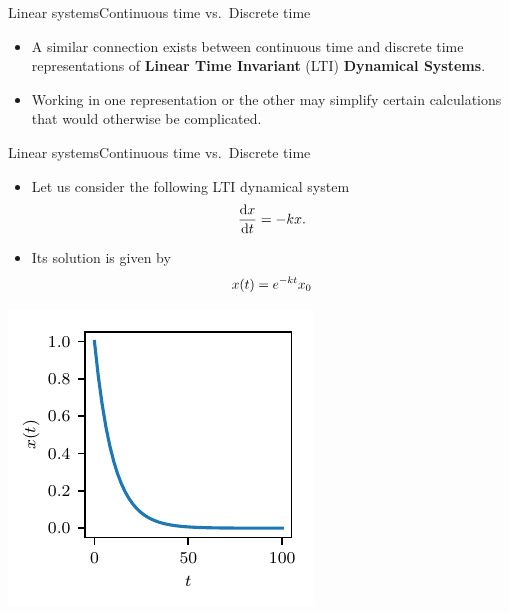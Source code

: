 \documentclass[usenames,dvipsnames,svgnames,10pt,aspectratio=169]{beamer}
\begin{document}
\begin{frame}[t, c]{Linear systems}{Continuous time vs.\ Discrete time}
	\begin{itemize}
		\item A similar connection exists between continuous time and discrete time representations of \alert{\textbf{Linear Time Invariant}} (LTI) \alert{\textbf{Dynamical Systems}}.

		\bigskip

		\item Working in one representation or the other may simplify certain calculations that would otherwise be complicated.
	\end{itemize}
	\vspace{1cm}
\end{frame}

\begin{frame}[t, c]{Linear systems}{Continuous time vs.\ Discrete time}
	\begin{minipage}{.48\textwidth}
		\begin{itemize}
			\item Let us consider the following LTI dynamical system
			\begin{equation}
				\displaystyle \frac{\mathrm{d}x}{\mathrm{d}t} = -k x.
				\notag
			\end{equation}

			\bigskip

			\item Its solution is given by
			\begin{equation}
				x(t) = e^{-k t}x_0
				\notag
			\end{equation}
		\end{itemize}
		\vspace{.5cm}
	\end{minipage}%
	\hfill
	\begin{minipage}{.48\textwidth}
		\centering
		\includegraphics[width=.75\textwidth]{first_order_system}
	\end{minipage}
\end{frame}
\end{document}
